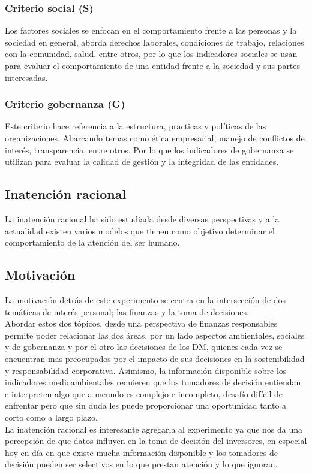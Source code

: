 \documentclass[11pt,letterpaper]{article}
\begin{document}
 \subsubsection{Criterio social (S)}
 Los factores sociales se enfocan en el comportamiento frente a las personas y la sociedad en general, aborda derechos laborales, condiciones de trabajo, relaciones con la comunidad, salud, entre otros, por lo que los indicadores sociales se usan para evaluar el comportamiento de una entidad frente a la sociedad y sus partes interesadas.

 \subsubsection{Criterio gobernanza (G)}
Este criterio hace referencia a la estructura, practicas y políticas de las organizaciones. Abarcando temas como ética empresarial, manejo de conflictos de interés, transparencia, entre otros. Por lo que los indicadores de gobernanza se utilizan para evaluar la calidad de gestión y la integridad de las entidades.


\subsection{Inatención racional}

La inatención racional ha sido estudiada desde diversas perspectivas y a la actualidad existen varios modelos que tienen como objetivo determinar el comportamiento de la atención del ser humano.


\subsection{Motivación}
La motivación detrás de este experimento se centra en la intersección de dos temáticas de interés personal; las finanzas y la toma de decisiones.\\
Abordar estos dos tópicos, desde una perspectiva de finanzas responsables permite poder relacionar las dos áreas, por un lado aspectos ambientales, sociales y de gobernanza y por el otro las decisiones de los DM, quienes cada vez se encuentran mas preocupados por el impacto de sus decisiones en la sostenibilidad y responsabilidad corporativa.
Asimismo, la información disponible sobre los indicadores medioambientales requieren que los tomadores de decisión entiendan e interpreten algo que a menudo es complejo e incompleto, desafío difícil de enfrentar pero que sin duda les puede proporcionar una oportunidad tanto a corto como a largo plazo.\\
La inatención racional es interesante agregarla al experimento ya que nos da una percepción de que datos influyen en la toma de decisión del inversores, en especial hoy en día en que existe mucha información disponible y los tomadores de decisión pueden ser selectivos en lo que prestan atención y lo que ignoran. 
\end{document}
